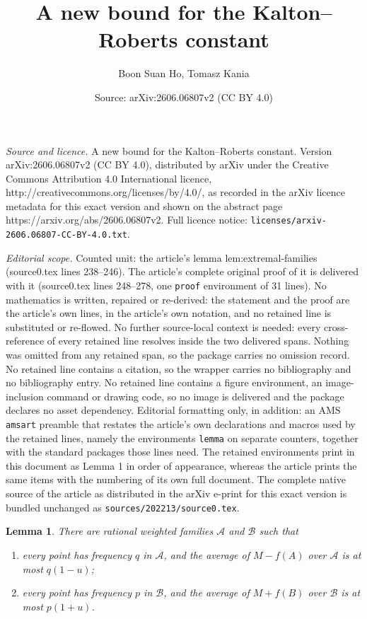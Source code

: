 \documentclass[10pt,a4paper]{amsart}
\title{A new bound for the Kalton--Roberts constant}
\author{Boon Suan Ho, Tomasz Kania}
\date{Source: arXiv:2606.06807v2 (CC BY 4.0)}
\newtheorem{lemma}{Lemma}
\newcommand{\cA}{\mathcal A}
\newcommand{\cB}{\mathcal B}
\begin{document}
\maketitle

\noindent\emph{Source and licence.} A new bound for the Kalton--Roberts constant. Version arXiv:2606.06807v2 (CC BY 4.0), distributed by arXiv under the Creative Commons Attribution 4.0 International licence, http://creativecommons.org/licenses/by/4.0/, as recorded in the arXiv licence metadata for this exact version and shown on the abstract page https://arxiv.org/abs/2606.06807v2. Full licence notice: \texttt{licenses/arxiv-2606.06807-CC-BY-4.0.txt}.\par\smallskip

\noindent\textit{Editorial scope.} Counted unit: the article's lemma lem:extremal-families (source0.tex lines 238--246). The article's complete original proof of it is delivered with it (source0.tex lines 248--278, one \texttt{proof} environment of 31 lines). No mathematics is written, repaired or re-derived: the statement and the proof are the article's own lines, in the article's own notation, and no retained line is substituted or re-flowed.  No further source-local context is needed: every cross-reference of every retained line resolves inside the two delivered spans.  Nothing was omitted from any retained span, so the package carries no omission record.  No retained line contains a citation, so the wrapper carries no bibliography and no bibliography entry.  No retained line contains a figure environment, an image-inclusion command or drawing code, so no image is delivered and the package declares no asset dependency.  Editorial formatting only, in addition: an AMS \texttt{amsart} preamble that restates the article's own declarations and macros used by the retained lines, namely the environments \texttt{lemma} on separate counters, together with the standard packages those lines need.  The retained environments print in this document as Lemma 1 in order of appearance, whereas the article prints the same items with the numbering of its own full document.  The complete native source of the article as distributed in the arXiv e-print for this exact version is bundled unchanged as \texttt{sources/202213/source0.tex}.
\begin{lemma}\label{lem:extremal-families}
There are rational weighted families \(\cA\) and \(\cB\) such that
\begin{enumerate}[label=\textup{(\roman*)}]
\item every point has frequency \(q\) in \(\cA\), and the average of
      \(M-f(A)\) over \(\cA\) is at most \(q(1-u)\);
\item every point has frequency \(p\) in \(\cB\), and the average of
      \(M+f(B)\) over \(\cB\) is at most \(p(1+u)\).
\end{enumerate}
\end{lemma}
\end{document}
